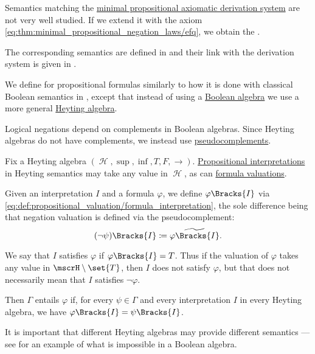 \smallskip

\begin{definition}\label{def:intuitionistic_propositional_axiomatic_derivation_system}
  Semantics matching the \hyperref[def:minimal_propositional_axiomatic_derivation_system]{minimal propositional axiomatic derivation system} are not very well studied. If we extend it with the axiom \eqref{eq:thm:minimal_propositional_negation_laws/efq}, we obtain the .

  The corresponding semantics are defined in  and their link with the derivation system is given in .
\end{definition}

\begin{definition}\label{def:propositional_heyting_semantics}
  We define  for propositional formulas similarly to how it is done with classical Boolean semantics in , except that instead of using a \hyperref[def:boolean_algebra]{Boolean algebra} we use a more general \hyperref[def:heyting_algebra]{Heyting algebra}.

  Logical negations depend on complements in Boolean algebras. Since Heyting algebras do not have complements, we instead use \hyperref[def:heyting_algebra/pseudocomplement]{pseudocomplements}.

  Fix a Heyting algebra \( (\mscrH, \sup, \inf, T, F, \rightarrow) \). \hyperref[def:propositional_valuation/interpretation]{Propositional interpretations} in Heyting semantics may take any value in \( \mscrH \), as can \hyperref[def:propositional_valuation/formula_semantics]{formula valuations}.

  Given an interpretation \( I \) and a formula \( \varphi \), we define \( \varphi\Bracks{I} \) via \eqref{eq:def:propositional_valuation/formula_interpretation}, the sole difference being that negation valuation is defined via the pseudocomplement:
  \begin{equation*}
    (\neg \psi)\Bracks{I} \coloneqq \widetilde{\varphi\Bracks{I}}.
  \end{equation*}

  We say that \( I \) satisfies \( \varphi \) if \( \varphi\Bracks{I} = T \). Thus if the valuation of \( \varphi \) takes any value in \( \mscrH \setminus \set{ T } \), then \( I \) does not satisfy \( \varphi \), but that does not necessarily mean that \( I \) satisfies \( \neg \varphi \).

  Then \( \Gamma \) entails \( \varphi \) if, for every \( \psi \in \Gamma \) and every interpretation \( I \) in every Heyting algebra, we have \( \varphi\Bracks{I} = \psi\Bracks{I} \).

  It is important that different Heyting algebras may provide different semantics --- see  for an example of what is impossible in a Boolean algebra.
\end{definition}

